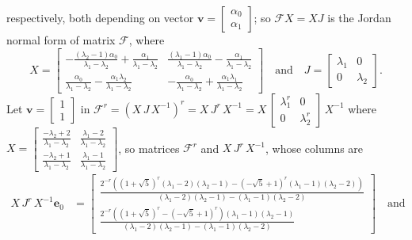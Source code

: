\begin{example}
respectively, both depending on vector $\boldsymbol{v} = \left[\begin{array}{c}\alpha_{0}\\\alpha_{1}\end{array}\right]$;
so $\mathcal{F}X=XJ$ is the Jordan normal form of matrix $\mathcal{F}$, where
\begin{displaymath}
X = \left[\begin{matrix}- \frac{\left(\lambda_{2} - 1\right) \alpha_{0}}{\lambda_{1} - \lambda_{2}} + \frac{\alpha_{1}}{\lambda_{1} - \lambda_{2}} & \frac{\left(\lambda_{1} - 1\right) \alpha_{0}}{\lambda_{1} - \lambda_{2}} - \frac{\alpha_{1}}{\lambda_{1} - \lambda_{2}}\\\frac{\alpha_{0}}{\lambda_{1} - \lambda_{2}} - \frac{\alpha_{1} \lambda_{2}}{\lambda_{1} - \lambda_{2}} & - \frac{\alpha_{0}}{\lambda_{1} - \lambda_{2}} + \frac{\alpha_{1} \lambda_{1}}{\lambda_{1} - \lambda_{2}}\end{matrix}\right]
\quad\text{and}\quad J = \left[\begin{matrix}\lambda_{1} & 0\\0 & \lambda_{2}\end{matrix}\right].
\end{displaymath}
Let $\boldsymbol{v} = \left[\begin{array}{c}1\\1\end{array}\right]$ in
$\displaystyle \mathcal{F}^{r} = \left(X\,J\,X^{-1}\right)^{r} = X\,J^{r}\,X^{-1} = X\,\left[\begin{matrix}\lambda_{1}^{r} & 0\\0 & \lambda_{2}^{r}\end{matrix}\right]\,X^{-1} $
where $\displaystyle X = \left[\begin{matrix}\frac{- \lambda_{2} + 2}{\lambda_{1} - \lambda_{2}} & \frac{\lambda_{1} - 2}{\lambda_{1} - \lambda_{2}}\\\frac{- \lambda_{2} + 1}{\lambda_{1} - \lambda_{2}} & \frac{\lambda_{1} - 1}{\lambda_{1} - \lambda_{2}}\end{matrix}\right]$,
so matrices $\mathcal{F}^{r}$ and $X\,J^{r}\,X^{-1}$, whose columns are
\begin{displaymath}
\begin{split}
X\,J^{r}\,X^{-1}\boldsymbol{e}_{0}  &= \left[\begin{matrix}\frac{2^{- r} \left(\left(1 + \sqrt{5}\right)^{r} \left(\lambda_{1} - 2\right) \left(\lambda_{2} - 1\right) - \left(- \sqrt{5} + 1\right)^{r} \left(\lambda_{1} - 1\right) \left(\lambda_{2} - 2\right)\right)}{\left(\lambda_{1} - 2\right) \left(\lambda_{2} - 1\right) - \left(\lambda_{1} - 1\right) \left(\lambda_{2} - 2\right)} \\\frac{2^{- r} \left(\left(1 + \sqrt{5}\right)^{r} - \left(- \sqrt{5} + 1\right)^{r}\right) \left(\lambda_{1} - 1\right) \left(\lambda_{2} - 1\right)}{\left(\lambda_{1} - 2\right) \left(\lambda_{2} - 1\right) - \left(\lambda_{1} - 1\right) \left(\lambda_{2} - 2\right)}  \end{matrix}\right]\quad\text{and}\\

\end{split}
\end{displaymath}
\end{example}
